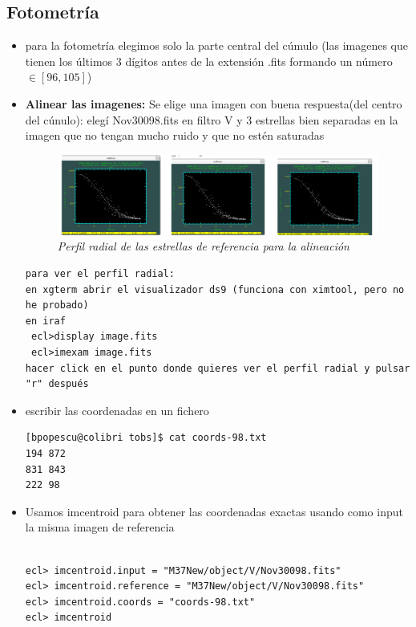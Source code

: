 \documentclass{article}
\begin{document}
\subsection*{Fotometría}
\begin{itemize}
\item para la fotometría elegimos solo la parte central del cúmulo (las imagenes que tienen los últimos 3 dígitos antes de la extensión .fits  formando un número $ \in  [96,105] $)
\item
\textbf{Alinear las imagenes:}
Se elige una imagen con buena respuesta(del centro del cúnulo): elegí Nov30098.fits en filtro V y 3 estrellas bien separadas en la imagen que no tengan mucho ruido y que no estén saturadas

\begin{figure}[!ht]
 \centering
 \includegraphics[scale=0.2]{align_rp.png}
 \caption{\emph{Perfil radial de las estrellas de referencia para la alineación}}
\end{figure}

\begin{verbatim}
para ver el perfil radial:
en xgterm abrir el visualizador ds9 (funciona con ximtool, pero no he probado)
en iraf
 ecl>display image.fits
 ecl>imexam image.fits
hacer click en el punto donde quieres ver el perfil radial y pulsar "r" después
\end{verbatim}


\item  escribir las coordenadas en un fichero
\begin{verbatim}
[bpopescu@colibri tobs]$ cat coords-98.txt
194 872
831 843
222 98
\end{verbatim}

\item Usamos imcentroid para obtener las coordenadas exactas usando como input la misma imagen de referencia

\begin{verbatim}

ecl> imcentroid.input = "M37New/object/V/Nov30098.fits" 
ecl> imcentroid.reference = "M37New/object/V/Nov30098.fits" 
ecl> imcentroid.coords = "coords-98.txt"
ecl> imcentroid


\end{verbatim}
\end{itemize}
\end{document}

